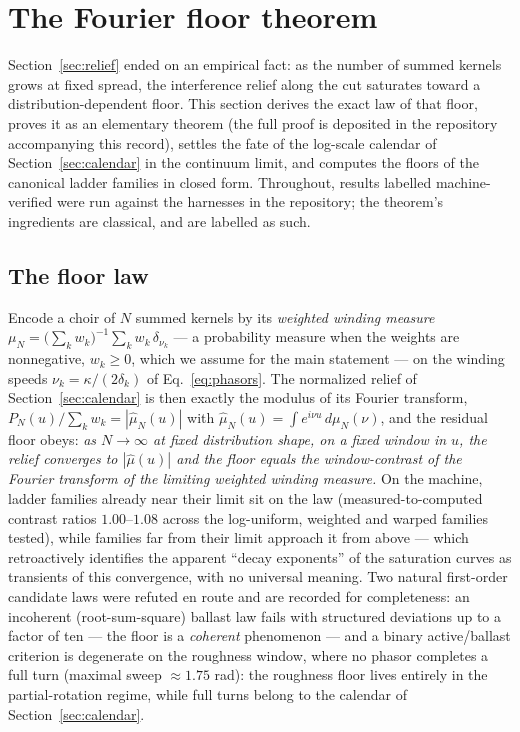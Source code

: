\documentclass[11pt,a4paper]{article}
\begin{document}
\section{The Fourier floor theorem}
\label{sec:floor}

Section~\ref{sec:relief} ended on an empirical fact: as the number of
summed kernels grows at fixed spread, the interference relief along the
cut saturates toward a distribution-dependent floor. This section derives
the exact law of that floor, proves it as an elementary theorem (the full
proof is deposited in the repository accompanying this record), settles
the fate of the log-scale calendar of Section~\ref{sec:calendar} in the
continuum limit, and computes the floors of the canonical ladder families
in closed form. Throughout, results labelled machine-verified were run
against the harnesses in the repository; the theorem's ingredients are
classical, and are labelled as such.

\subsection{The floor law}
\label{sec:floorlaw}

Encode a choir of $N$ summed kernels by its \emph{weighted winding
measure}
$\mu_N = \bigl(\sum_k w_k\bigr)^{-1} \sum_k w_k\, \delta_{\nu_k}$ --- a
probability measure when the weights are nonnegative, $w_k \geq 0$, which we
assume for the main statement --- on the
winding speeds $\nu_k = \kappa/(2\delta_k)$ of
Eq.~\eqref{eq:phasors}. The normalized relief of
Section~\ref{sec:calendar} is then exactly the modulus of its Fourier
transform, $P_N(u)/\sum_k w_k = |\hat{\mu}_N(u)|$ with
$\hat{\mu}_N(u) = \int e^{i\nu u}\, d\mu_N(\nu)$, and the residual floor
obeys:
\emph{as $N \to \infty$ at fixed distribution shape, on a fixed window in
$u$, the relief converges to $|\hat{\mu}(u)|$ and the floor equals the
window-contrast of the Fourier transform of the limiting weighted winding
measure.} On the machine, ladder families already near their limit sit on
the law (measured-to-computed contrast ratios $1.00$--$1.08$ across the
log-uniform, weighted and warped families tested), while families far
from their limit approach it from above --- which retroactively
identifies the apparent ``decay exponents'' of the saturation curves as
transients of this convergence, with no universal meaning. Two natural
first-order candidate laws were refuted en route and are recorded for
completeness: an incoherent (root-sum-square) ballast law fails with
structured deviations up to a factor of ten --- the floor is a
\emph{coherent} phenomenon --- and a binary active/ballast criterion is
degenerate on the roughness window, where no phasor completes a full
turn (maximal sweep $\approx 1.75$ rad): the roughness floor lives
entirely in the partial-rotation regime, while full turns belong to the
calendar of Section~\ref{sec:calendar}.
\end{document}
